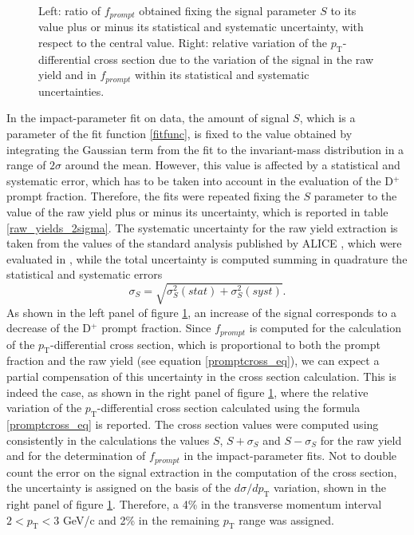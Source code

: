 \documentclass[b5paper,10pt,twoside,oldstyle,classica]{toptesi}
\newcommand{\pt}{p_\text{T}}
\begin{document}
\begin{figure}[b]
\begin{center}
\caption{Left: ratio of $f_{prompt}$ obtained fixing the signal parameter $S$ to its value plus or minus its statistical and systematic uncertainty, with respect to the central value. Right: relative variation of the $\pt$-differential cross section due to the variation of the signal in the raw yield and in $f_{prompt}$ within its statistical and systematic uncertainties.}
\label{SoverT_syst}
\end{center}
\end{figure} 
In the impact-parameter fit on data, the amount of signal $S$, which is a parameter of the fit function \ref{fitfunc}, is fixed to the value obtained by integrating the Gaussian term from the fit to the invariant-mass distribution in a range of $2\sigma$ around the mean. However, this value is affected by a statistical and systematic error, which has to be taken into account in the evaluation of the D$^+$ prompt fraction. Therefore, the fits were repeated fixing the $S$ parameter to the value of the raw yield plus or minus its uncertainty, which is reported in table \ref{raw_yields_2sigma}. The systematic uncertainty for the raw yield extraction is taken from the values of the standard analysis published by ALICE \cite{Abelev:2014hha}, which were evaluated in \cite{Russo:2015xtz}, while the total uncertainty is computed summing in quadrature the statistical and systematic errors
\begin{equation}
 \sigma_{S} = \sqrt{\sigma_{S}^2(stat)+\sigma_{S}^2(syst)}.
\end{equation}
As shown in the left panel of figure \ref{SoverT_syst}, an increase of the signal corresponds to a decrease of the D$^+$ prompt fraction. Since $f_{prompt}$ is computed for the calculation of the $\pt$-differential cross section, which is proportional to both the prompt fraction and the raw yield (see equation \ref{promptcross_eq}), we can expect a partial compensation of this uncertainty in the cross section calculation. This is indeed the case, as shown in the right panel of figure \ref{SoverT_syst}, where the relative variation of the $\pt$-differential cross section calculated using the formula \ref{promptcross_eq} is reported. The cross section values were computed using consistently in the calculations the values $S$, $S+\sigma_S$ and $S-\sigma_S$ for the raw yield and for the determination of $f_{prompt}$ in the impact-parameter fits. Not to double count the error on the signal extraction in the computation of the cross section, the uncertainty is assigned on the basis of the $d\sigma/d\pt$ variation, shown in the right panel of figure \ref{SoverT_syst}. Therefore, a 4\% in the transverse momentum interval $2 <\pt < 3$ GeV/c and 2\% in the remaining $\pt$ range was assigned. 
\end{document}
